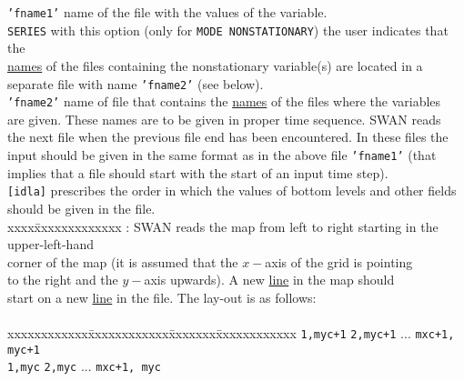 \documentclass[12pt]{book}
\begin{document}
\begin{tabbing}
{\tt 'fname1'}      \> name of the file with the values of the variable.\\
{\tt SERIES}        \> with this option (only for {\tt MODE NONSTATIONARY}) the user indicates that the\+\\
                       \underline{names} of the files containing the nonstationary variable(s) are located in a\\
                       separate file with name {\tt 'fname2'} (see below).\-\\
{\tt 'fname2'}      \> name of file that contains the \underline{names} of the files where the variables\+\\
                       are given. These names are to be given in proper time sequence. SWAN reads\\
                       the next file when the previous file end has been encountered. In these files the\\
                       input should be given in the same format as in the above file {\tt 'fname1'} (that\\
                       implies that a file should start with the start of an input time step).\-\\
{\tt [idla]}        \> prescribes the order in which the values of bottom levels and other fields\+\\
                       should be given in the file.\\
                       \pushtabs
                       xxxx\=xxxxxxxxxxxxx : \> SWAN reads the map from left to right starting in the upper-left-hand\+\\
                              corner of the map (it is assumed that the $x-$axis of the grid is pointing\\
                              to the right and the $y-$axis upwards). A new \underline{line} in the map should\\
                              start on a new \underline{line} in the file. The lay-out is as follows:\\
                              \\
                              \pushtabs
                              xxxxxxxxxxxx\=xxxxxxxxxxxx\=xxxxxxx\=xxxxxxxxxxxx \kill
                              {\tt 1,myc+1} \> {\tt 2,myc+1} \> ... \> {\tt mxc+1, myc+1} \\
                              {\tt 1,myc}   \> {\tt 2,myc}   \> ... \> {\tt mxc+1, myc} \\

\end{tabbing}
\end{document}
